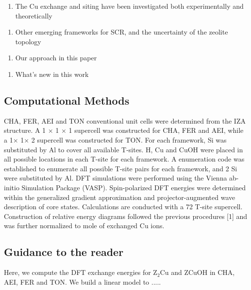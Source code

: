 \documentclass[12pt]{article}
\begin{document}
\begin{enumerate}[resume]
\item The Cu exchange and siting have been investigated both experimentally and theoretically
\end{enumerate}

\begin{enumerate}[resume]
\item Other emerging frameworks for SCR, and the uncertainty of the zeolite topology
\end{enumerate}

\begin{enumerate}[resume]
\item Our approach in this paper
\end{enumerate}

\begin{enumerate}[resume]
\item What's new in this work
\end{enumerate}

\subsection*{Computational Methods}

CHA, FER, AEI and TON conventional unit cells were determined from the IZA structure. A 1 $\times$ 1 $\times$ 1 supercell was constructed for CHA, FER and AEI, while a 1$\times$ 1$\times$ 2 supercell was constructed for TON. For each framework, Si was  substituted by Al to cover all available T-sites. H, Cu and CuOH were placed in all possible locations in each T-site for each framework. A enumeration code was established to enumerate all possible T-site pairs for each framework, and 2 Si were substituted by Al. DFT simulations were performed using the Vienna ab-initio Simulation Package (VASP). Spin-polarized DFT energies were determined within the generalized gradient approximation and projector-augmented wave description of core states. Calculations are conducted with a 72 T-site supercell. Construction of relative energy diagrams followed the previous procedures [1] and was further normalized to mole of exchanged Cu ions.



\subsection*{Guidance to the reader}
Here, we compute the DFT exchange energies for Z$_{2}$Cu and ZCuOH in CHA, AEI, FER and TON. We build a linear model to .....
\end{document}
